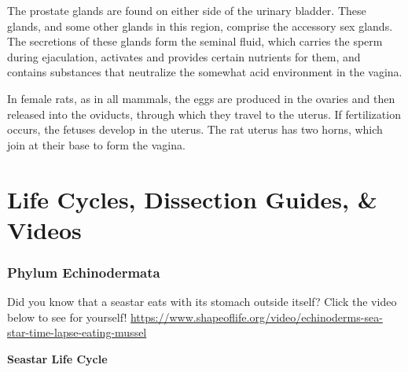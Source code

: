 \documentclass[
]{book}
\begin{document}
The prostate glands are found on either side of the urinary bladder. These glands, and some other glands in this region, comprise the accessory sex glands. The secretions of these glands form the seminal fluid, which carries the sperm during ejaculation, activates and provides certain nutrients for them, and contains substances that neutralize the somewhat acid environment in
the vagina.

In female rats, as in all mammals, the eggs are produced in the ovaries and then released into the
oviducts, through which they travel to the uterus. If fertilization occurs, the fetuses develop in the uterus. The rat uterus has two horns, which join at their base to form the vagina.

\hypertarget{life-cycles-dissection-guides-videos-1}{%
\chapter*{Life Cycles, Dissection Guides, \& Videos}\label{life-cycles-dissection-guides-videos-1}}

\hypertarget{phylum-echinodermata-1}{%
\subsection*{Phylum Echinodermata}\label{phylum-echinodermata-1}}

Did you know that a seastar eats with its stomach outside itself? Click the video below to see for yourself! \url{https://www.shapeoflife.org/video/echinoderms-sea-star-time-lapse-eating-mussel}

\textbf{Seastar Life Cycle}
\end{document}
